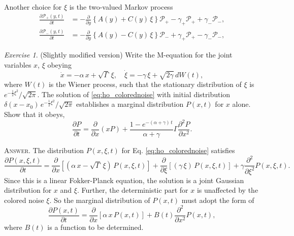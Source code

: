 \documentclass{book}
\numberwithin{equation}{section}
\theoremstyle{plain}
\theoremstyle{definition}
\theoremstyle{remark}
\newtheorem{exercise}{Exercise}
\newcommand{\answer}[1]{{\color{DarkBlue}\footnotesize \textsc{Answer.} #1}}
\begin{document}
Another choice for $\xi$ is the two-valued Markov process
\begin{equation}
\begin{aligned}
  \frac{ \partial \mathscr P_+(y, t) } { \partial t }
  &=
  - \frac{ \partial } { \partial y }
  \left\{
    A(y) + C(y) \, \xi
  \right\} \mathscr P_+
  -\gamma_+ \mathscr P_+ + \gamma_- \mathscr P_-,
  \\
  \frac{ \partial \mathscr P_-(y, t) } { \partial t }
  &=
  - \frac{ \partial } { \partial y }
  \left\{
    A(y) - C(y) \, \xi
  \right\} \mathscr P_-
  + \gamma_+ \mathscr P_+ - \gamma_- \mathscr P_-,
\end{aligned}
\label{eq:Langevin_joint_y_xi}
\end{equation}


\begin{exercise}
  (Slightly modified version)
  Write the M-equation for the joint variables $x$, $\xi$ obeying
  \begin{equation}
  \dot x = -\alpha \, x + \sqrt{\Gamma} \, \xi,
  \quad
  \dot \xi = -\gamma \, \xi + \sqrt{2 \gamma} \, d W(t),
  \label{eq:ho_colorednoise}
  \end{equation}
  where $W(t)$ is the Wiener process,
  such that the stationary distribution of $\xi$
  is $e^{-\frac{1}{2}\xi^2}/\sqrt{2\pi}$.
  The solution of \eqref{eq:ho_colorednoise} with initial distribution
  $\delta(x - x_0) \, e^{-\frac{1}{2}\xi^2}/\sqrt{2\pi}$
  establishes a marginal distribution $P(x, t)$
  for $x$ alone. Show that it obeys,
  \begin{equation}
  \frac{ \partial P } { \partial t } = \frac{ \partial } { \partial x } (x P)
  +
  \frac{ 1 - e^{-(\alpha + \gamma) \, t} } {\alpha + \gamma} \Gamma
  \frac{ \partial^2 P } { \partial x^2 }.
  \label{eq:ho_colorednoise_Px}
  \end{equation}

  \answer{
    The distribution $P(x, \xi, t)$ for
    Eq. \eqref{eq:ho_colorednoise} satisfies
    $$
    \frac{ \partial P(x, \xi, t) } { \partial t }
    =
    \frac{ \partial } { \partial x }
    \left[
      \left( \alpha \, x - \sqrt{\Gamma} \, \xi \right) \, P(x, \xi, t)
    \right]
    +
    \frac{ \partial } { \partial \xi }
    \left[
      (\gamma \, \xi ) \, P(x, \xi, t)
    \right]
    +
    \gamma
    \frac{ \partial^2 } { \partial \xi^2} P(x, \xi, t).
    $$
    Since this is a linear Fokker-Planck equation,
    the solution is a joint Gaussian distribution
    for $x$ and $\xi$.
    Further, the deterministic part for $x$
    is unaffected by the colored noise $\xi$.
    So the marginal distribution of $P(x, t)$
    must adopt the form of
    \begin{equation}
    \frac{ \partial P(x, t) } { \partial t }
    =
    \frac{ \partial } { \partial x }
    \left[
      \alpha \, x \, P(x, t)
    \right]
    +
    B(t)
    \frac{ \partial^2 } { \partial x^2} P(x, t),
    \label{eq:ho_colorednoise_Px1}
    \end{equation}
    where $B(t)$
    is a function to be determined.

}
\end{exercise}
\end{document}
